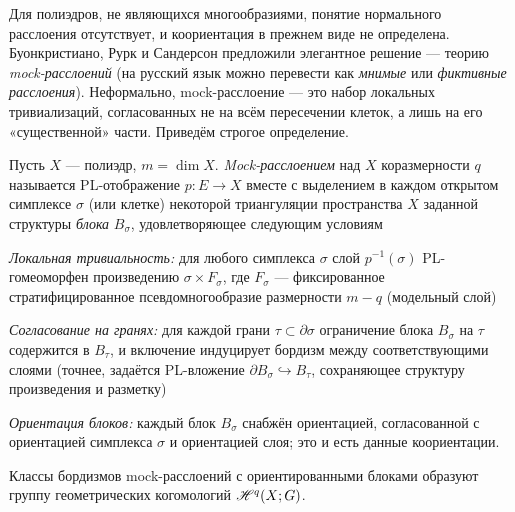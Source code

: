 \documentclass[12pt, twoside]{article}
\begin{document}
Для полиэдров, не являющихся многообразиями, понятие нормального расслоения отсутствует, и коориентация в прежнем виде не определена. Буонкристиано, Рурк и Сандерсон предложили элегантное решение --- теорию \emph{mock-расслоений} (на русский язык можно перевести как \emph{мнимые} или \emph{фиктивные расслоения}). Неформально, mock-расслоение --- это набор локальных тривиализаций, согласованных не на всём пересечении клеток, а лишь на его «существенной» части. Приведём строгое определение.

\begin{definition}\label{def:mock}
Пусть $X$ --- полиэдр, $m = \dim X$. \emph{Mock-расслоением} над $X$ коразмерности $q$ называется PL-отображение $p: E \to X$ вместе с выделением в каждом открытом симплексе $\sigma$ (или клетке) некоторой триангуляции пространства $X$ заданной структуры \emph{блока} $B_\sigma$, удовлетворяющее следующим условиям
\begin{conditions}
\item \emph{Локальная тривиальность:} для любого симплекса $\sigma$ слой $p^{-1}(\sigma)$ PL-гомеоморфен произведению $\sigma \times F_\sigma$, где $F_\sigma$ --- фиксированное стратифицированное псевдомногообразие размерности $m-q$ (модельный слой)
\item \emph{Согласование на гранях:} для каждой грани $\tau \subset \partial \sigma$ ограничение блока $B_\sigma$ на $\tau$ содержится в $B_\tau$, и включение индуцирует бордизм между соответствующими слоями (точнее, задаётся PL-вложение $\partial B_\sigma \hookrightarrow B_\tau$, сохраняющее структуру произведения и разметку)
\item \emph{Ориентация блоков:} каждый блок $B_\sigma$ снабжён ориентацией, согласованной с ориентацией симплекса $\sigma$ и ориентацией слоя; это и есть данные коориентации.
\end{conditions}
Классы бордизмов mock-расслоений с ориентированными блоками образуют группу геометрических когомологий $\mathscr{H}^q(X;G)$.
\end{definition}
\end{document}
